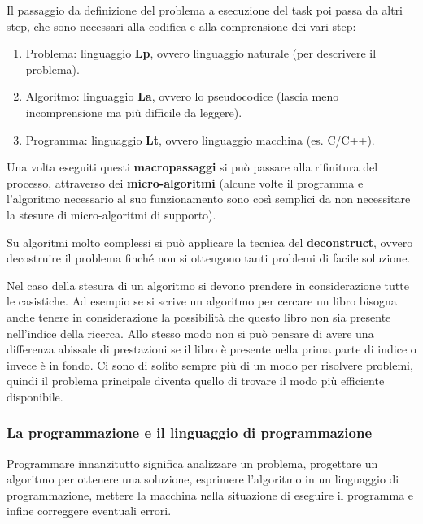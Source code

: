 \documentclass[
]{article}
\begin{document}
Il passaggio da definizione del problema a esecuzione del task poi passa
da altri step, che sono necessari alla codifica e alla comprensione dei
vari step:

\begin{enumerate}
\def\labelenumi{\arabic{enumi}.}
\item
  Problema: linguaggio \textbf{Lp}, ovvero linguaggio naturale (per
  descrivere il problema).
\item
  Algoritmo: linguaggio \textbf{La}, ovvero lo pseudocodice (lascia meno
  incomprensione ma più difficile da leggere).
\item
  Programma: linguaggio \textbf{Lt}, ovvero linguaggio macchina (es.
  C/C++).
\end{enumerate}

Una volta eseguiti questi \textbf{macropassaggi} si può passare alla
rifinitura del processo, attraverso dei \textbf{micro-algoritmi} (alcune
volte il programma e l'algoritmo necessario al suo funzionamento sono
così semplici da non necessitare la stesure di micro-algoritmi di
supporto).

Su algoritmi molto complessi si può applicare la tecnica del
\textbf{deconstruct}, ovvero decostruire il problema finché non si
ottengono tanti problemi di facile soluzione.

Nel caso della stesura di un algoritmo si devono prendere in
considerazione tutte le casistiche. Ad esempio se si scrive un algoritmo
per cercare un libro bisogna anche tenere in considerazione la
possibilità che questo libro non sia presente nell'indice della ricerca.
Allo stesso modo non si può pensare di avere una differenza abissale di
prestazioni se il libro è presente nella prima parte di indice o invece
è in fondo. Ci sono di solito sempre più di un modo per risolvere
problemi, quindi il problema principale diventa quello di trovare il
modo più efficiente disponibile.

\hypertarget{header-n56}{%
\subsubsection{La programmazione e il linguaggio di
programmazione}\label{header-n56}}

Programmare innanzitutto significa analizzare un problema, progettare un
algoritmo per ottenere una soluzione, esprimere l'algoritmo in un
linguaggio di programmazione, mettere la macchina nella situazione di
eseguire il programma e infine correggere eventuali errori.
\end{document}
